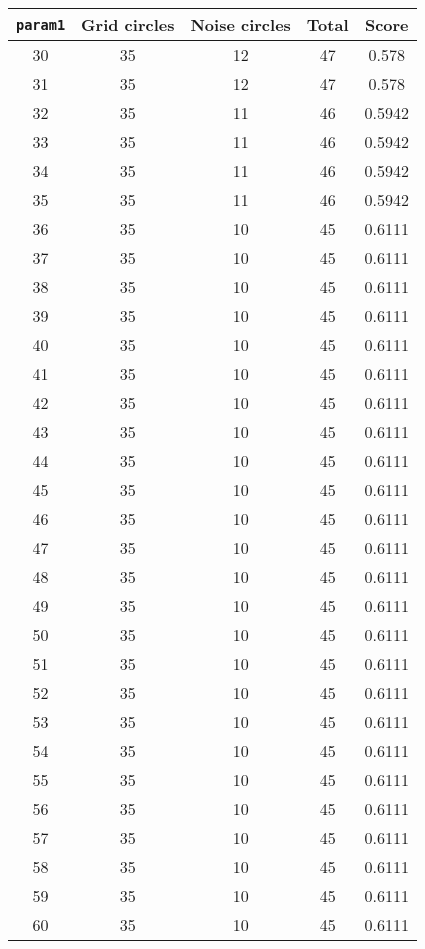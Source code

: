 \documentclass[letterpaper, 12pt]{article}
\begin{document}
\begin{longtable}{|c|c|c|c|c|}
\hline
\textbf{\texttt{param1}} & \textbf{Grid circles} & \textbf{Noise circles} & \textbf{Total} & \textbf{Score} \\
\hline
30 & 35 & 12 & 47 & 0.578 \\
\hline
31 & 35 & 12 & 47 & 0.578 \\
\hline
32 & 35 & 11 & 46 & 0.5942 \\
\hline
33 & 35 & 11 & 46 & 0.5942 \\
\hline
34 & 35 & 11 & 46 & 0.5942 \\
\hline
35 & 35 & 11 & 46 & 0.5942 \\
\hline
36 & 35 & 10 & 45 & 0.6111 \\
\hline
37 & 35 & 10 & 45 & 0.6111 \\
\hline
38 & 35 & 10 & 45 & 0.6111 \\
\hline
39 & 35 & 10 & 45 & 0.6111 \\
\hline
40 & 35 & 10 & 45 & 0.6111 \\
\hline
41 & 35 & 10 & 45 & 0.6111 \\
\hline
42 & 35 & 10 & 45 & 0.6111 \\
\hline
43 & 35 & 10 & 45 & 0.6111 \\
\hline
44 & 35 & 10 & 45 & 0.6111 \\
\hline
45 & 35 & 10 & 45 & 0.6111 \\
\hline
46 & 35 & 10 & 45 & 0.6111 \\
\hline
47 & 35 & 10 & 45 & 0.6111 \\
\hline
48 & 35 & 10 & 45 & 0.6111 \\
\hline
49 & 35 & 10 & 45 & 0.6111 \\
\hline
50 & 35 & 10 & 45 & 0.6111 \\
\hline
51 & 35 & 10 & 45 & 0.6111 \\
\hline
52 & 35 & 10 & 45 & 0.6111 \\
\hline
53 & 35 & 10 & 45 & 0.6111 \\
\hline
54 & 35 & 10 & 45 & 0.6111 \\
\hline
55 & 35 & 10 & 45 & 0.6111 \\
\hline
56 & 35 & 10 & 45 & 0.6111 \\
\hline
57 & 35 & 10 & 45 & 0.6111 \\
\hline
58 & 35 & 10 & 45 & 0.6111 \\
\hline
59 & 35 & 10 & 45 & 0.6111 \\
\hline
60 & 35 & 10 & 45 & 0.6111 \\

\end{longtable}
\end{document}
